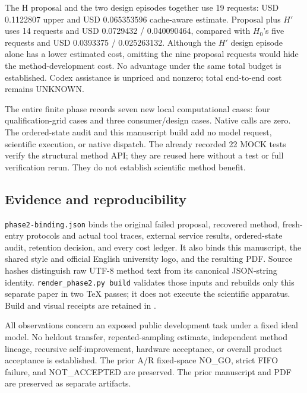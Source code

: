 The H proposal and the two design episodes together use 19 requests:
USD 0.1122807 upper and USD 0.065353596 cache-aware estimate. Proposal plus $H'$
uses 14 requests and USD 0.0729432 / 0.040090464, compared with $H_0$'s five
requests and USD 0.0393375 / 0.025263132. Although the $H'$ design episode alone
has a lower estimated cost, omitting the nine proposal requests would hide the
method-development cost. No advantage under the same total budget is established.
Codex assistance is unpriced and nonzero; total end-to-end cost remains UNKNOWN.

The entire finite phase records seven new local computational cases: four
qualification-grid cases and three consumer/design cases. Native calls are zero.
The ordered-state audit and this manuscript build add no model request,
scientific execution, or native dispatch. The already recorded 22 MOCK tests
verify the structural method API; they are reused here without a test or full
verification rerun. They do not establish scientific method benefit.

\subsection{Evidence and reproducibility}
\texttt{phase2-binding.json} binds the original failed proposal, recovered method,
fresh-entry protocols and actual tool traces, external service results,
ordered-state audit, retention decision, and every cost ledger. It also binds
this manuscript, the shared style and official English university logo, and
the resulting PDF. Source hashes distinguish raw UTF-8 method text from its
canonical JSON-string identity. \texttt{render\_phase2.py build} validates those
inputs and rebuilds only this separate paper in two TeX passes; it does not
execute the scientific apparatus. Build and visual receipts are retained in
.

All observations concern an exposed public development task under a fixed
ideal model. No heldout transfer, repeated-sampling estimate, independent
method lineage, recursive self-improvement, hardware acceptance, or overall
product acceptance is established. The prior A/R fixed-space NO\_GO, strict FIFO
failure, and NOT\_ACCEPTED are preserved. The prior manuscript and PDF are
preserved as separate artifacts.
